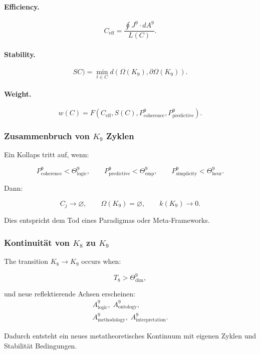 \paragraph{Efficiency.}
\[
  C_{\mathrm{eff}} = 
  \frac{\oint J^9 \cdot dA^9}{L(C)}.
\]

\paragraph{Stability.}
\[
SC)
    = \min_{t\in C}
      d(\Omega(K_9),\partial\Omega(K_9)).
\]

\paragraph{Weight.}
\[
  w(C) = F(C_{\mathrm{eff}}, S(C),
          P^9_{\mathrm{coherence}},
          P^9_{\mathrm{predictive}}).
\]


\subsubsection{Zusammenbruch von \texorpdfstring{$K_9$}{K_9} Zyklen}

Ein Kollaps tritt auf, wenn:

\[
  P^9_{\mathrm{coherence}} < \Theta^9_{\mathrm{logic}},\qquad
  P^9_{\mathrm{predictive}} < \Theta^9_{\mathrm{emp}},\qquad
  P^9_{\mathrm{simplicity}} < \Theta^9_{\mathrm{heur}}.
\]

Dann:

\[
  C_j \to \varnothing,\qquad
  \Omega(K_9)=\varnothing,\qquad
  k(K_9)\to 0.
\]

Dies entspricht dem Tod eines Paradigmas oder Meta-Frameworks.


\subsubsection{Kontinuität von \texorpdfstring{$K_8$}{K_8} zu \texorpdfstring{$K_9$}{K_9}}

The transition $K_8\to K_9$ occurs when:

\[
  T_8 > \Theta^9_{\mathrm{dim}},
\]

und neue reflektierende Achsen erscheinen:
\[
  \begin{aligned}
  A^9_{\mathrm{logic}},\;
  A^9_{\mathrm{ontology}},\\
  A^9_{\mathrm{methodology}},\;
  A^9_{\mathrm{interpretation}}.
  \end{aligned}
\]

Dadurch entsteht ein neues metatheoretisches Kontinuum mit eigenen Zyklen und Stabilität
Bedingungen.
